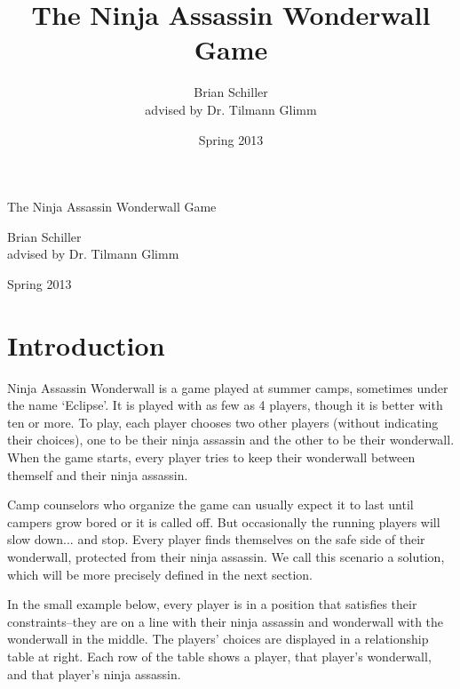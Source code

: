 \documentclass[12pt,x11names, rgb]{article}
\title{The Ninja Assassin Wonderwall Game}
\author{Brian Schiller \\ { advised by Dr. Tilmann Glimm}}
\date{Spring 2013}
\begin{document}
\begin{center}
{\LARGE The Ninja Assassin Wonderwall Game }

\large
\vspace{12pt}
Brian Schiller\\
advised by Dr. Tilmann Glimm
\vspace{6pt}

Spring 2013
\end{center}

\tableofcontents

\section{Introduction}
\label{sec:introduction}
    Ninja Assassin Wonderwall is a game played at summer camps, sometimes under the name `Eclipse'. It is played with as few as 4 players, though it is better with ten or more. To play, each player chooses two other players (without indicating their choices), one to be their ninja assassin and the other to be their wonderwall. When the game starts, every player tries to keep their wonderwall between themself and their ninja assassin.

    Camp counselors who organize the game can usually expect it to last until campers grow bored or it is called off. But occasionally the running players will slow down... and stop. Every player finds themselves on the safe side of their wonderwall, protected from their ninja assassin. We call this scenario a solution, which will be more precisely defined in the next section.

    In the small example below, every player is in a position that satisfies their constraints--they are on a line with their ninja assassin and wonderwall with the wonderwall in the middle. The players' choices are displayed in a relationship table at right. Each row of the table shows a player, that player's wonderwall, and that player's ninja assassin.
\end{document}
